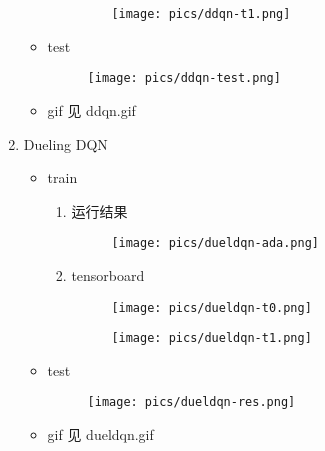 \documentclass[a4paper,12pt]{article}
\begin{document}
\begin{enumerate}
\begin{itemize}
\begin{enumerate}
            \newpage
            \begin{figure*}[h!]
                \centering
                \texttt{[image: pics/ddqn-t1.png]}
            \end{figure*}
        \end{enumerate}
        \item test
        \begin{figure*}[h!]
            \centering
            \texttt{[image: pics/ddqn-test.png]}
        \end{figure*}
        \item gif 见 ddqn.gif
    \end{itemize}
    \item Dueling DQN
    \begin{itemize}
        \item train 
        \begin{enumerate}
            \item 运行结果
            \begin{figure*}[h!]
                \centering
                \texttt{[image: pics/dueldqn-ada.png]}
            \end{figure*}
            \newpage
            \item tensorboard
            \begin{figure*}[h!]
                \centering
                \texttt{[image: pics/dueldqn-t0.png]}
            \end{figure*}
            \begin{figure*}[h!]
                \centering
                \texttt{[image: pics/dueldqn-t1.png]}
            \end{figure*}
        \end{enumerate}
        \item test
        \begin{figure*}[h!]
            \centering
            \texttt{[image: pics/dueldqn-res.png]}
        \end{figure*}
        \item gif 见 dueldqn.gif
    \end{itemize}
\end{enumerate}

\newpage
\end{document}
